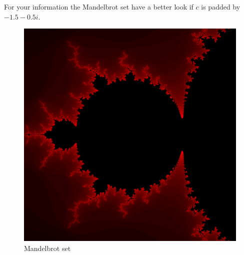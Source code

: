 \documentclass{article}
\begin{document}
For your information the Mandelbrot set have a better look if $c$ is padded by $-1.5 - 0.5i$.

\begin{figure}[H]
	\centering
	\includegraphics[scale=0.35]{figures/Mandelbrot.png}
	\caption{Mandelbrot set}
\end{figure}
\end{document}
